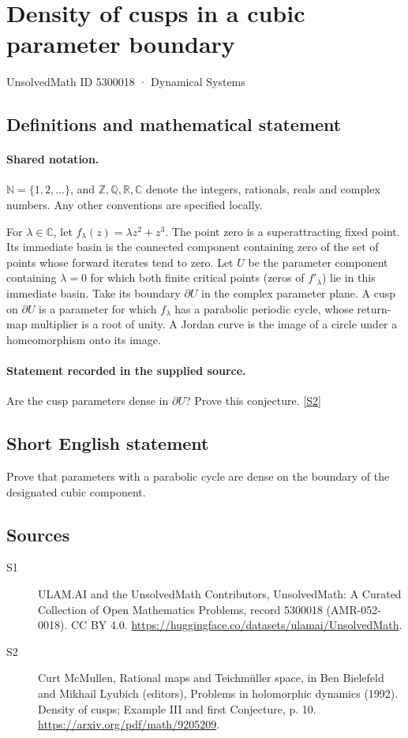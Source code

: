 \documentclass[11pt]{article}
\newcommand{\sref}[2]{\hyperlink{source:#1:#2}{[S#2]}}
\begin{document}
\setcounter{section}{5300017}
\section{Density of cusps in a cubic parameter boundary}\label{5300018}
{\small\sffamily UnsolvedMath ID 5300018 · Dynamical Systems}
\subsection{Definitions and mathematical statement}

\paragraph{Shared notation.}$\mathbb N=\{1,2,\ldots\}$, and $\mathbb Z,\mathbb Q,\mathbb R,\mathbb C$ denote the integers, rationals, reals and complex numbers. Any other conventions are specified locally.


For $\lambda\in\mathbb C$, let $f_\lambda(z)=\lambda z^2+z^3$. The point zero is a superattracting fixed point. Its immediate basin is the connected component containing zero of the set of points whose forward iterates tend to zero. Let $U$ be the parameter component containing $\lambda=0$ for which both finite critical points (zeros of $f'_\lambda$) lie in this immediate basin. Take its boundary $\partial U$ in the complex parameter plane. A cusp on $\partial U$ is a parameter for which $f_\lambda$ has a parabolic periodic cycle, whose return-map multiplier is a root of unity. A Jordan curve is the image of a circle under a homeomorphism onto its image.
\paragraph{Statement recorded in the supplied source.}
Are the cusp parameters dense in $\partial U$? Prove this conjecture. \sref{5300018}{2}
\subsection{Short English statement}
Prove that parameters with a parabolic cycle are dense on the boundary of the designated cubic component.
\subsection{Sources}
\begin{description}
\item[\hypertarget{source:5300018:1}{S1}] ULAM.AI and the UnsolvedMath Contributors, UnsolvedMath: A Curated Collection of Open Mathematics Problems, record 5300018 (AMR-052-0018). CC BY 4.0. \url{https://huggingface.co/datasets/ulamai/UnsolvedMath}.
\item[\hypertarget{source:5300018:2}{S2}] Curt McMullen, Rational maps and Teichmüller space, in Ben Bielefeld and Mikhail Lyubich (editors), Problems in holomorphic dynamics (1992). Density of cusps; Example III and first Conjecture, p. 10. \url{https://arxiv.org/pdf/math/9205209}.
\end{description}
\label{end:5300018}
\end{document}
